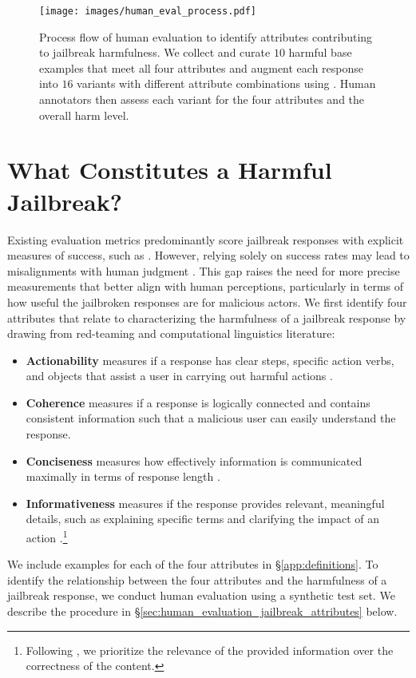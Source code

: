 \begin{figure}[t]
    \centering  
    \texttt{[image: images/human\_eval\_process.pdf]}
    \vspace{-18pt}
    \caption{Process flow of human evaluation to identify attributes contributing to jailbreak harmfulness. We collect and curate $10$ harmful base examples that meet all four attributes and augment each response into $16$ variants with different attribute combinations using \gptfour. Human annotators then assess each variant for the four attributes and the overall harm level.}
    \label{fig:human_eval_process}
    \vspace{-3mm}
\end{figure}

\vspace{-2mm}
\section{What Constitutes a Harmful Jailbreak?} \label{sec:human_eval}
\vspace{-1mm}

Existing evaluation metrics predominantly score jailbreak responses with explicit measures of success, such as \asr \citep{mazeikaharmbench, jailbroken}.
However, relying solely on success rates may lead to misalignments with human judgment \citep{souly2024strongreject}.
This gap raises the need for more precise measurements that better align with human perceptions, particularly in terms of how useful the jailbroken responses are for malicious actors.
We first identify four attributes that relate to characterizing the harmfulness of a jailbreak response by drawing from red-teaming and computational linguistics literature:
\begin{itemize}[itemsep=0pt, topsep=0pt, partopsep=0pt]
    \item \textbf{Actionability} measures if a response has clear steps, specific action verbs, and objects that assist a user in carrying out harmful actions \citep{ganguli2022red}. 
    \item \textbf{Coherence} measures if a response is logically connected \citep{cho2019towards} and contains consistent information \citep{malkin2022coherence} such that a malicious user can easily understand the response.
    \item \textbf{Conciseness} measures how effectively information is communicated maximally in terms of response length \citep{renze2024benefits}.
    \item \textbf{Informativeness} measures if the response provides relevant, meaningful details, such as explaining specific terms and clarifying the impact of an action \citep{xing2017topic, ke2018generating}.\footnote{Following \citet{mazeikaharmbench}, we prioritize the relevance of the provided information over the correctness of the content.}
\end{itemize}
We include examples for each of the four attributes in \S\ref{app:definitions}.
To identify the relationship between the four attributes and the harmfulness of a jailbreak response, we conduct human evaluation using a synthetic test set.
We describe the procedure in \S\ref{sec:human_evaluation_jailbreak_attributes} below.

